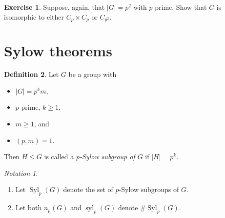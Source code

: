 \documentclass[10pt,letterpaper,cm]{nupset}
\theoremstyle{definition}
\newtheorem{definition}{Definition}[subsection]
\theoremstyle{theorem}
\newtheorem{exercise}[definition]{Exercise}
\theoremstyle{remark}
\newtheorem*{notation}{Notation}
\newcommand{\1}{\mathbf{1}}
\newcommand{\0}{\vec 0}
\DeclareMathOperator{\syl}{syl}
\DeclareMathOperator{\Syl}{Syl}
\begin{document}
\begin{exercise}
Suppose, again, that $\left\lvert{G}\right\rvert =p^2$ with $p$ prime. Show that $G$  is isomorphic to either $C_p \times C_p$ or $C_{p^2}$.
\end{exercise}

\section{Sylow theorems}

\begin{definition}
Let $G$ be a group with 
\begin{itemize}
\item $\left\lvert{G}\right\rvert= p^km$,
\item  $p$ prime, $k\geq 1$, 
\item $m\geq 1$, and 
\item $\left(p,m\right) =1$. 
\end{itemize}
Then $H \leq G$ is called a \textit{$p$-Sylow subgroup of $G$} if $\left\lvert{H}\right\rvert = p^k$.
\end{definition}

\begin{notation} $ $
\begin{enumerate}
\item  Let $\Syl_p(G)$ denote the set of $p$-Sylow subgroups of $G$. 
\item  Let both $n_p(G)$ and $\syl_p(G)$ denote $\#{\Syl_p(G)}$. 
\end{enumerate}
\end{notation}

\smallskip
\end{document}

